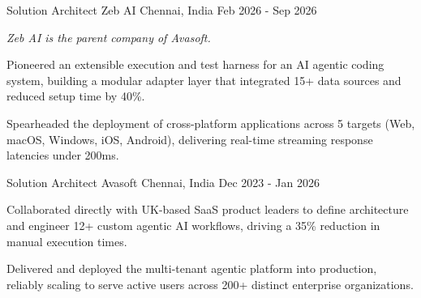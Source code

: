 

\begin{cventries}

  \cventry
    {Solution Architect} %
    {Zeb AI} %
    {Chennai, India} %
    {Feb 2026 - Sep 2026} %
    {
      \begin{cvitems} %
        \item {\textit{Zeb AI is the parent company of Avasoft.}}
        \item {Pioneered an extensible execution and test harness for an AI agentic coding system, building a modular adapter layer that integrated 15+ data sources and reduced setup time by 40\%.}
        \item {Spearheaded the deployment of cross-platform applications across 5 targets (Web, macOS, Windows, iOS, Android), delivering real-time streaming response latencies under 200ms.}
      \end{cvitems}
    }
  \vspace{6mm}
  \cventry
    {Solution Architect} %
    {Avasoft} %
    {Chennai, India} %
    {Dec 2023 - Jan 2026} %
    {
      \begin{cvitems} %
        \item {Collaborated directly with UK-based SaaS product leaders to define architecture and engineer 12+ custom agentic AI workflows, driving a 35\% reduction in manual execution times.}
        \item {Delivered and deployed the multi-tenant agentic platform into production, reliably scaling to serve active users across 200+ distinct enterprise organizations.}
      \end{cvitems}
    }

\end{cventries}
